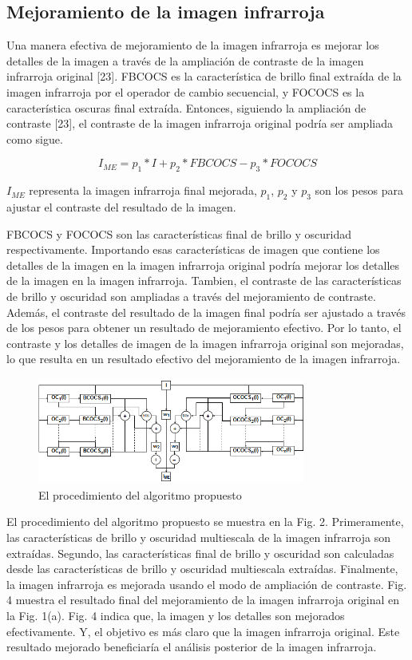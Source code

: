 \documentclass[a4paper, 11 pt, conference]{ieeeconf}      %
\begin{document}
\subsection{Mejoramiento de la imagen infrarroja}

Una manera efectiva de mejoramiento de la imagen infrarroja es mejorar los detalles de la imagen a trav\'es de la ampliaci\'on de contraste de la imagen infrarroja original [23]. FBCOCS es la caracter\'istica de brillo final extra\'ida de la imagen infrarroja por el operador de cambio secuencial, y FOCOCS es la caracter\'istica oscuras final extra\'ida. Entonces, siguiendo la ampliaci\'on de contraste [23], el contraste de la imagen infrarroja original podr\'ia ser ampliada como sigue. 

$$
I_{ME} = p_1  *  I + p_2 * FBCOCS - p_3 * FOCOCS
$$

$I_{ME}$ representa la imagen infrarroja final mejorada, $p_1$, $p_2$ y $p_3$ son los pesos para ajustar el contraste del resultado de la imagen.

FBCOCS y FOCOCS son las caracter\'isticas final de brillo y oscuridad respectivamente. Importando esas caracter\'isticas de imagen que contiene los detalles de la imagen en la imagen infrarroja original podr\'ia mejorar los detalles de la imagen en la imagen infrarroja. Tambien, el contraste de las caracter\'isticas de brillo y oscuridad son ampliadas a trav\'es del mejoramiento de contraste. Adem\'as, el contraste del resultado de la imagen final  podr\'ia ser ajustado a trav\'es de los pesos para obtener un resultado de mejoramiento efectivo. Por lo tanto, el contraste y los detalles de imagen de la imagen infrarroja original son mejoradas, lo que resulta en un resultado efectivo del mejoramiento de la imagen infrarroja.

\begin{figure}
    \includegraphics[width=8.8cm,height=3.5cm,angle=0]{rsc/AP.png}
    \caption{El procedimiento del algoritmo propuesto}
    \label{fig:Fig. 2}
\end{figure}

El procedimiento del algoritmo propuesto se muestra en la Fig. 2. Primeramente, las caracter\'isticas de brillo y oscuridad multiescala de la imagen infrarroja son extra\'idas. Segundo, las caracter\'isticas final de brillo y oscuridad son calculadas desde las caracter\'isticas de brillo y oscuridad multiescala extra\'idas. Finalmente, la imagen infrarroja es mejorada usando el modo de ampliaci\'on de contraste. Fig. 4 muestra el resultado final del mejoramiento de la imagen infrarroja original en la Fig. 1(a). Fig. 4 indica que, la imagen y los detalles son mejorados efectivamente. Y, el objetivo es m\'as claro que la imagen infrarroja original. Este resultado mejorado beneficiar\'ia el an\'alisis posterior de la imagen infrarroja.
\end{document}
